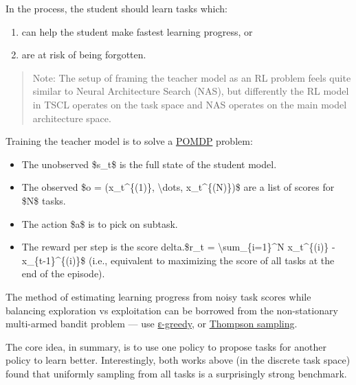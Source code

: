 In the process, the student should learn tasks which:

\begin{enumerate}
\tightlist
\item
  can help the student make fastest learning progress, or
\item
  are at risk of being forgotten.
\end{enumerate}

\begin{quote}
Note: The setup of framing the teacher model as an RL problem feels quite similar to Neural Architecture Search (NAS), but differently the RL model in TSCL operates on the task space and NAS operates on the main model architecture space.
\end{quote}

Training the teacher model is to solve a \href{https://en.wikipedia.org/wiki/Partially_observable_Markov_decision_process}{POMDP} problem:

\begin{itemize}
\tightlist
\item
  The unobserved \$s\_t\$ is the full state of the student model.
\item
  The observed \$o = (x\_t\^{}\{(1)\}, \textbackslash dots, x\_t\^{}\{(N)\})\$ are a list of scores for \$N\$ tasks.
\item
  The action \$a\$ is to pick on subtask.
\item
  The reward per step is the score delta.\$r\_t = \textbackslash sum\_\{i=1\}\^{}N x\_t\^{}\{(i)\} - x\_\{t-1\}\^{}\{(i)\}\$ (i.e., equivalent to maximizing the score of all tasks at the end of the episode).
\end{itemize}

The method of estimating learning progress from noisy task scores while balancing exploration vs exploitation can be borrowed from the non-stationary multi-armed bandit problem --- use \href{https://lilianweng.github.io/posts/2018-01-23-multi-armed-bandit/\#\%CE\%B5-greedy-algorithm}{ε-greedy}, or \href{https://lilianweng.github.io/posts/2018-01-23-multi-armed-bandit/\#thompson-sampling}{Thompson sampling}.

The core idea, in summary, is to use one policy to propose tasks for another policy to learn better. Interestingly, both works above (in the discrete task space) found that uniformly sampling from all tasks is a surprisingly strong benchmark.

